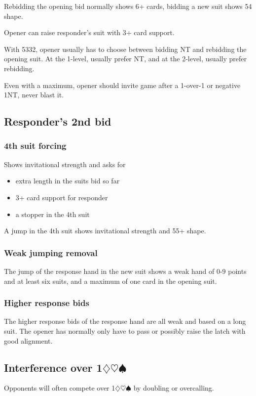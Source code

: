 \documentclass[a4paper, twoside, 11pt]{article}
\begin{document}
\begin{multicols}{3}
Rebidding the opening bid normally shows 6+ cards, bidding a new suit shows 54 shape.

Opener can raise responder's suit with 3+ card support.

With 5332, opener usually has to choose between bidding NT and rebidding the opening suit. At the 1-level, usually prefer NT, and at the 2-level, usually prefer rebidding.

Even with a maximum, opener should invite game after a 1-over-1 or negative 1NT, never blast it.

\subsection*{Responder's 2nd bid}

\subsubsection*{4th suit forcing}
Shows invitational strength and asks for \begin{itemize}
    \item extra length in the suits bid so far
    \item 3+ card support for responder
    \item a stopper in the 4th suit
\end{itemize}

A jump in the 4th suit shows invitational strength and 55+ shape.

\subsubsection*{Weak jumping removal}
The jump of the response hand in the new suit shows a weak
hand of 0-9 points and at least six suits, and
a maximum of one card in the opening suit.


\subsubsection*{Higher response bids}
The higher response bids of the response hand are all weak and
based on a long suit. The opener has
normally only have to pass or possibly raise
the latch with good alignment.

\subsection*{Interference over 1$\diamondsuit\heartsuit\spadesuit$}
Opponents will often compete over 1$\diamondsuit\heartsuit\spadesuit$ by doubling or overcalling.


\end{multicols}
\end{document}
